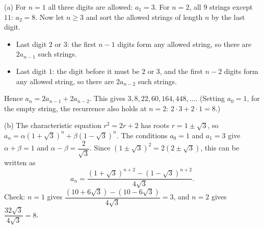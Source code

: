 (a) For $n=1$ all three digits are allowed: $a_1=3$. For $n=2$, all $9$ strings except $11$: $a_2=8$. Now let $n\ge3$ and sort the allowed strings of length $n$ by the last digit.
\begin{itemize}
\item Last digit $2$ or $3$: the first $n-1$ digits form any allowed string, so there are $2a_{n-1}$ such strings.
\item Last digit $1$: the digit before it must be $2$ or $3$, and the first $n-2$ digits form any allowed string, so there are $2a_{n-2}$ such strings.
\end{itemize}
Hence $a_n=2a_{n-1}+2a_{n-2}$. This gives $3,8,22,60,164,448,\dots$. (Setting $a_0=1$, for the empty string, the recurrence also holds at $n=2$: $2\cdot3+2\cdot1=8$.)

(b) The characteristic equation $r^2=2r+2$ has roots $r=1\pm\sqrt3$, so $a_n=\alpha(1+\sqrt3)^n+\beta(1-\sqrt3)^n$. The conditions $a_0=1$ and $a_1=3$ give $\alpha+\beta=1$ and $\alpha-\beta=\dfrac{2}{\sqrt3}$. Since $(1\pm\sqrt3)^2=2(2\pm\sqrt3)$, this can be written as
\[
\boxed{a_n=\dfrac{(1+\sqrt3)^{n+2}-(1-\sqrt3)^{n+2}}{4\sqrt3}}.
\]
Check: $n=1$ gives $\dfrac{(10+6\sqrt3)-(10-6\sqrt3)}{4\sqrt3}=3$, and $n=2$ gives $\dfrac{32\sqrt3}{4\sqrt3}=8$.
